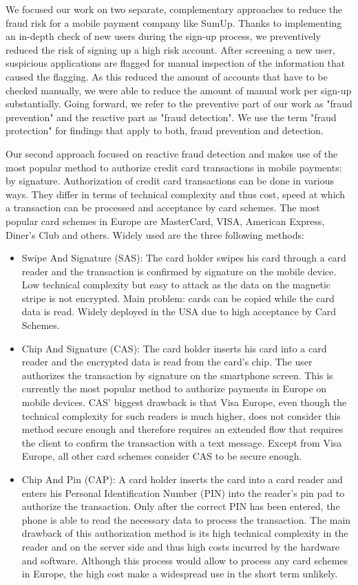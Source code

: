 \documentclass[a4paper, oneside]{csthesis}
\begin{document}
We focused our work on two separate, complementary approaches to reduce the fraud risk for a mobile payment company like SumUp.
Thanks to implementing an in-depth check of new users during the sign-up process, we preventively reduced the risk of signing up a high risk account. After screening a new user, suspicious applications are flagged for manual inspection of the information that caused the flagging. As this reduced the amount of accounts that have to be checked manually, we were able to reduce the amount of manual work per sign-up substantially.
Going forward, we refer to the preventive part of our work as "fraud prevention" and the reactive part as "fraud detection". We use the term "fraud protection" for findings that apply to both, fraud prevention and detection.

Our second approach focused on reactive fraud detection and makes use of the most popular method to authorize credit card transactions in mobile payments: by signature.
Authorization of credit card transactions can be done in various ways. They differ in terms of technical complexity and thus cost, speed at which a transaction can be processed and acceptance by card schemes. The most popular card schemes in Europe are MasterCard, VISA, American Express, Diner's Club and others. Widely used are the three following methods:

\begin{itemize}
\item Swipe And Signature (SAS): The card holder swipes his card through a card reader and the transaction is confirmed by signature on the mobile device. Low technical complexity but easy to attack as the data on the magnetic stripe is not encrypted. Main problem: cards can be copied while the card data is read. Widely deployed in the USA due to high acceptance by Card Schemes.
\item Chip And Signature (CAS): The card holder inserts his card into a card reader and the encrypted data is read from the card's chip. The user authorizes the transaction by signature on the smartphone screen. This is currently the most popular method to authorize payments in Europe on mobile devices. CAS' biggest drawback is that Visa Europe, even though the technical complexity for such readers is much higher, does not consider this method secure enough and therefore requires an extended flow that requires the client to confirm the transaction with a text message. Except from Visa Europe, all other card schemes consider CAS to be secure enough.
\item Chip And Pin (CAP): A card holder inserts the card into a card reader and enters his Personal Identification Number (PIN) into the reader's pin pad to authorize the transaction. Only after the correct PIN has been entered, the phone is able to read the necessary data to process the transaction. The main drawback of this authorization method is its high technical complexity in the reader and on the server side and thus high costs incurred by the hardware and software. Although this process would allow to process any card schemes in Europe, the high cost make a widespread use in the short term unlikely.
\end{itemize}
\end{document}
